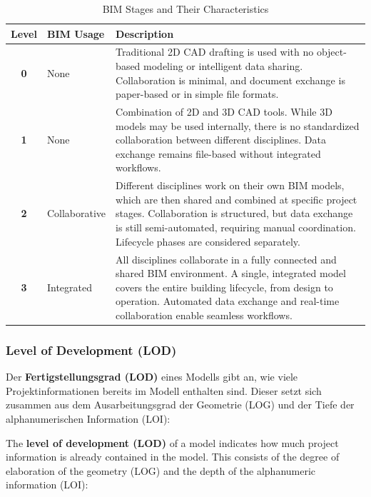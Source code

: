 \begin{table}[h]
    \centering
    \renewcommand{\arraystretch}{1.2} %
    \setlength{\tabcolsep}{5pt} %
    \begin{tabularx}{\textwidth}{|c|l|X|}
        \hline
        \textbf{Level} & \textbf{BIM Usage} & \textbf{Description}  \\
        \hline
        \textbf{0} & None &  Traditional 2D CAD drafting is used with no object-based modeling or intelligent data sharing. Collaboration is minimal, and document exchange is paper-based or in simple file formats. \\
        \hline
        \textbf{1} & None &  Combination of 2D and 3D CAD tools. While 3D models may be used internally, there is no standardized collaboration between different disciplines. Data exchange remains file-based without integrated workflows. \\
        \hline
        \textbf{2} & Collaborative &  Different disciplines work on their own BIM models, which are then shared and combined at specific project stages. Collaboration is structured, but data exchange is still semi-automated, requiring manual coordination. Lifecycle phases are considered separately. \\
        \hline
        \textbf{3} & Integrated & All disciplines collaborate in a fully connected and shared BIM environment. A single, integrated model covers the entire building lifecycle, from design to operation. Automated data exchange and real-time collaboration enable seamless workflows. \\
        \hline
    \end{tabularx}
    \caption{BIM Stages and Their Characteristics}
    \label{tab:BIM_stages}
\end{table}

\subsubsection{Level of Development (LOD)}

\begin{German}
    Der \textbf{Fertigstellungsgrad (LOD)} eines Modells gibt an, wie viele Projektinformationen bereits im Modell enthalten sind. Dieser setzt sich zusammen aus dem Ausarbeitungsgrad der Geometrie (LOG) und der Tiefe der alphanumerischen Information (LOI):  \\
\end{German}
\begin{English}
    The \textbf{level of development (LOD)} of a model indicates how much project information is already contained in the model. This consists of the degree of elaboration of the geometry (LOG) and the depth of the alphanumeric information (LOI):  \\
\end{English}

